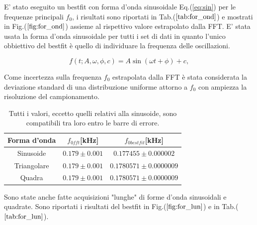 \documentclass{article}
\begin{document}
    E' stato eseguito un bestfit con forma d'onda sinusoidale Eq.(\ref{eq:sin}) 
    per le frequenze principali $f_0$, i risultati 
    sono riportati in Tab.($\ref{tab:for_ond}$) e 
    mostrati in Fig.($\ref{fig:for_ond}$) assieme al rispettivo valore 
    estrapolato dalla FFT.
    E' stata usata la forma d'onda sinusoidale  per tutti i set di dati
    in quanto l'unico obbiettivo del bestfit
    è quello di individuare la frequenza delle oscillazioni.


        \begin{equation}
            f(t; A, \omega, \phi, c) = A \sin{(\omega t + \phi)} + c,
            \label{eq:sin}
        \end{equation}

    Come incertezza sulla frequenza $f_0$ estrapolata dalla FFT è stata 
    considerata la deviazione standard di una distribuzione uniforme attorno
    a $f_0$ con ampiezza la risoluzione del campionamento.  
         

        \begin{table}[H]
            \centering
                \begin{tabular}{ccc}
                    Forma d'onda    &   $f_{0fft}$[kHz]                     & $f_{0bestfit}$[kHz] \\
                    \hline
                    Sinusoide       &   $0.179 \pm 0.001$           & $0.177455 \pm 0.000002$ \\
                    Triangolare     &   $0.179 \pm 0.001$           & $0.1780571\pm 0.0000009$ \\
                    Quadra          &   $0.179 \pm 0.001$           & $0.1780571 \pm 0.0000009$ \\
                \end{tabular}
                \caption{Tutti i valori, eccetto quelli relativi alla sinusoide,
                        sono compatibili tra loro entro le barre di errore. }
                \label{tab:for_ond}
        \end{table}

    Sono state anche fatte acquisizioni "lunghe" di forme d'onda sinusoidali
    e quadrate. Sono riportati i risultati del bestfit in Fig.($\ref{fig:for_lun}$)
    e in Tab.($\ref{tab:for_lun}$).

         
\end{document}
